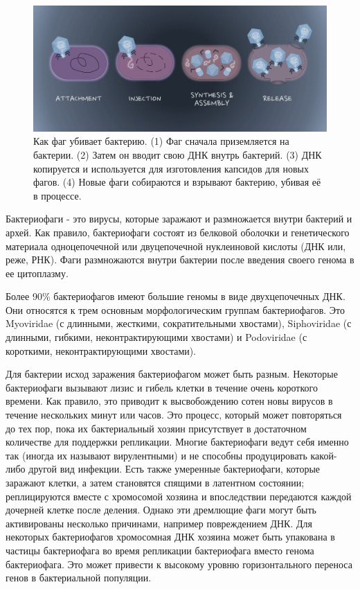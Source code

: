 \documentclass[14pt]{extarticle}
\begin{document}
    \begin{figure}[h]
        \centering
            \includegraphics[width=\textwidth]{img/average_phage.jpg}
        \caption{Как фаг убивает бактерию. (1) Фаг сначала приземляется на бактерии. (2) Затем он вводит свою ДНК внутрь
        бактерий. (3) ДНК копируется и используется для изготовления капсидов для новых фагов. (4) Новые фаги собираются
        и взрывают бактерию, убивая её в процессе. \cite{advdisphage}}
        \label{fig:skybox}
    \end{figure}
    
	\par{Бактериофаги - это вирусы, которые заражают и размножается внутри бактерий и архей. Как правило, бактериофаги 
	состоят из белковой оболочки и генетического материала одноцепочечной или двуцепочечной нуклеиновой кислоты (ДНК 
	или, реже, РНК). Фаги размножаются внутри бактерии после введения своего генома в ее цитоплазму. 
	\cite{phagewikieng,phagewikiru}}
	
	\par{Более 90\% бактериофагов имеют большие геномы в виде двухцепочечных ДНК. Они относятся к трем основным 
	морфологическим группам бактериофагов. Это Myoviridae (с длинными, жесткими, сократительными хвостами), Siphoviridae
	(с длинными, гибкими, неконтрактирующими хвостами) и Podoviridae (с короткими, неконтрактирующими хвостами). 
	\cite{phageapps}}
	
	\par{Для бактерии исход заражения бактериофагом может быть разным. Некоторые бактериофаги вызывают лизис и гибель 
	клетки в течение очень короткого времени. Как правило, это приводит к высвобождению сотен новы вирусов в течение 
	нескольких минут или часов. Это процесс, который может повторяться до тех пор, пока их бактериальный хозяин 
	присутствует в достаточном количестве для поддержки репликации. Многие бактериофаги ведут себя именно так (иногда их
	называют вирулентными) и не способны продуцировать какой-либо другой вид инфекции. Есть также умеренные 
	бактериофаги, которые заражают клетки, а затем становятся спящими в латентном состоянии; реплицируются вместе с 
	хромосомой хозяина и впоследствии передаются каждой дочерней клетке после деления. Однако эти дремлющие фаги могут 
	быть активированы несколько причинами, например повреждением ДНК. Для некоторых бактериофагов хромосомная ДНК 
	хозяина может быть упакована в частицы бактериофага во время репликации бактериофага вместо генома бактериофага. Это
	может привести к высокому уровню горизонтального переноса генов в бактериальной популяции.  \cite{phagetreat}}
    
\end{document}
